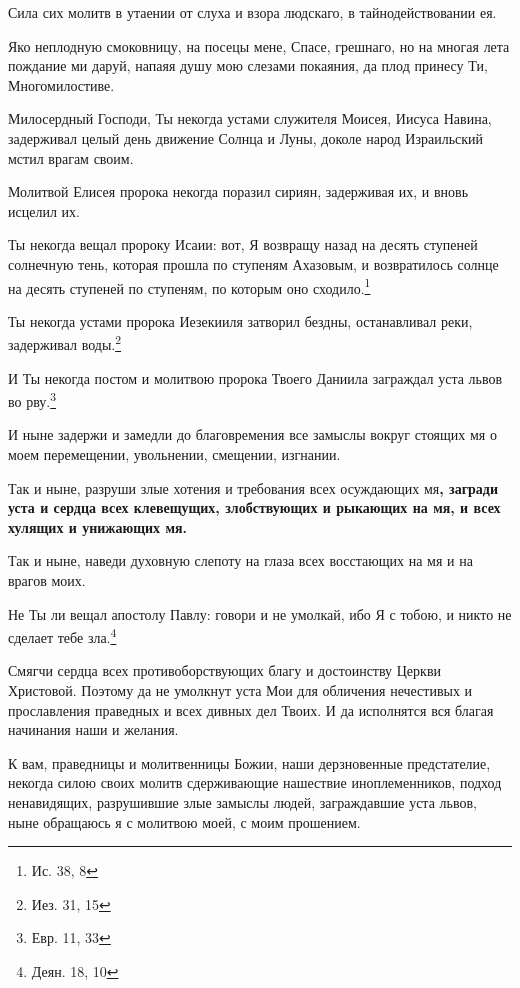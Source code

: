 Сила сих молитв в утаении от слуха и взора людскаго, в тайнодействовании ея.

\normalfont{}

Яко неплодную смоковницу, на посецы мене, Спасе, грешнаго, но на многая лета пождание ми даруй, напаяя душу мою слезами покаяния, да плод принесу Ти, Многомилостиве.



Милосердный Господи, Ты некогда устами служителя Моисея, Иисуса Навина, задерживал целый день движение Солнца и Луны, доколе народ Израильский мстил врагам своим. 

Молитвой Елисея пророка некогда поразил сириян, задерживая их, и вновь исцелил их.

Ты некогда вещал пророку Исаии: вот, Я возвращу назад на десять ступеней солнечную тень, которая прошла по ступеням Ахазовым, и возвратилось солнце на десять ступеней по ступеням, по которым оно сходило.\footnote[1]{Ис. 38, 8}

Ты некогда устами пророка Иезекииля затворил бездны, останавливал реки, задерживал воды.\footnote[2]{Иез. 31, 15}

И Ты некогда постом и молитвою пророка Твоего Даниила заграждал уста львов во рву.\footnote[3]{Евр. 11, 33}

И ныне задержи и замедли до благовремения все замыслы вокруг стоящих мя о моем перемещении, увольнении, смещении, изгнании. 

Так и ныне, разруши злые хотения и требования всех осуждающих мя\bfseries  \normalfont{}, загради уста и сердца всех клевещущих, злобствующих и рыкающих на мя, и всех хулящих и унижающих мя.

Так и ныне, наведи духовную слепоту на глаза всех восстающих на мя и на врагов моих.

Не Ты ли вещал апостолу Павлу: говори и не умолкай, ибо Я с тобою, и никто не сделает тебе зла.\footnote[4]{Деян. 18, 10}

Смягчи сердца всех противоборствующих благу и достоинству Церкви Христовой. Поэтому да не умолкнут уста Мои для обличения нечестивых и прославления праведных и всех дивных дел Твоих. И да исполнятся вся благая начинания наши и желания. 


К вам, праведницы и молитвенницы Божии, наши дерзновенные предстателие, некогда силою своих молитв сдерживающие нашествие иноплеменников, подход ненавидящих, разрушившие злые замыслы людей, заграждавшие уста львов, ныне обращаюсь я с молитвою моей, с моим прошением.


